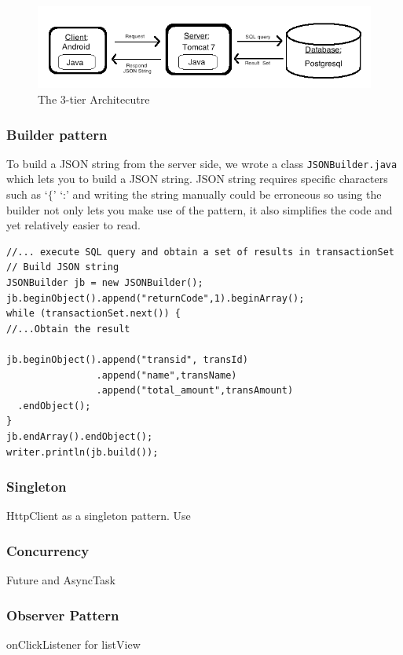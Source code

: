 \documentclass[a4paper,11pt]{article}
\begin{document}
\begin{figure}[ht]
\begin{center}
\advance\leftskip-3cm
\advance\rightskip-3cm
\includegraphics[keepaspectratio=true,scale=0.5]{3tier}
\caption{The 3-tier Architecutre}
\label{visina8}
\end{center}
\end{figure}

\subsubsection*{Builder pattern}
To build a JSON string from the server side, we wrote a class \texttt{JSONBuilder.java} which lets you to build a JSON string. JSON string requires specific characters such as `$\lbrace$' `:' and writing the string manually could be erroneous so using the builder not only lets you make use of the pattern, it also simplifies the code and yet relatively easier to read. 

\begin{verbatim}
//... execute SQL query and obtain a set of results in transactionSet
// Build JSON string
JSONBuilder jb = new JSONBuilder();
jb.beginObject().append("returnCode",1).beginArray();
while (transactionSet.next()) {
//...Obtain the result
						
jb.beginObject().append("transid", transId)
                .append("name",transName)
                .append("total_amount",transAmount)
  .endObject();
}
jb.endArray().endObject();			
writer.println(jb.build());
\end{verbatim}

\subsubsection*{Singleton}
HttpClient as a singleton pattern. Use 

\subsubsection*{Concurrency}
 Future and AsyncTask
 
\subsubsection*{Observer Pattern}
onClickListener for listView 
 
\end{document}
